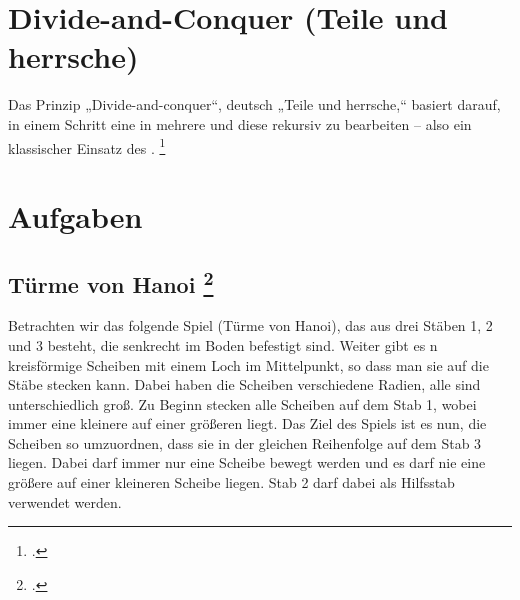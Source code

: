 \documentclass{lehramt-informatik}
\begin{document}

\chapter{Divide-and-Conquer (Teile und herrsche)}

\begin{quellen}
\item \cite[Seite 7-9]{aud:fs:3}
\item \cite[Seite 218-222 (PDF 236-240)]{saake}
\item \cite{wiki:teile-und-herrsche-verfahren}
\end{quellen}

Das Prinzip „Divide-and-conquer“, deutsch „Teile und herrsche,“ basiert
darauf, in einem Schritt eine  in mehrere
 und diese rekursiv zu bearbeiten –
also ein klassischer Einsatz des .
\footcite[Seite 219 (PDF 237)]{saake}


\chapter{Aufgaben}

\section{Türme von Hanoi
\footcite[Seite 1, Aufgabe 2: Türme von Hanoi]{aud:ab:7}
}

Betrachten wir das folgende Spiel (Türme von Hanoi), das aus drei Stäben
1, 2 und 3 besteht, die senkrecht im Boden befestigt sind. Weiter gibt
es n kreisförmige Scheiben mit einem Loch im Mittelpunkt, so dass man
sie auf die Stäbe stecken kann. Dabei haben die Scheiben verschiedene
Radien, alle sind unterschiedlich groß. Zu Beginn stecken alle Scheiben
auf dem Stab 1, wobei immer eine kleinere auf einer größeren liegt. Das
Ziel des Spiels ist es nun, die Scheiben so umzuordnen, dass sie in der
gleichen Reihenfolge auf dem Stab 3 liegen. Dabei darf immer nur eine
Scheibe bewegt werden und es darf nie eine größere auf einer kleineren
Scheibe liegen. Stab 2 darf dabei als Hilfsstab verwendet werden.
\end{document}

